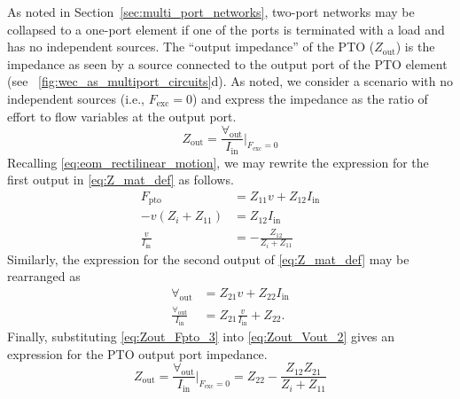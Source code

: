 \documentclass[lettersize,journal]{IEEEtran}
\begin{document}
As noted in Section~\ref{sec:multi_port_networks}, two-port networks may be collapsed to a one-port element if one of the ports is terminated with a load and has no independent sources.
The ``output impedance'' of the PTO ($Z_{\textrm{out}}$) is the impedance as seen by a source connected to the output port of the PTO element (see \figurename~\ref{fig:wec_as_multiport_circuits}d).
As noted, we consider a scenario with no independent sources (i.e., $F_{\textrm{exc}} = 0$) and express the impedance as the ratio of effort to flow variables at the output port. 
%
\begin{equation}
        Z_{\textrm{out}} = \frac{\forall_{\textrm{out}}}{I_{\textrm{in}}} \bigg\vert_{F_{\textrm{exc}}=0}
        \label{eq:Zout_1}
\end{equation}
%
Recalling \eqref{eq:eom_rectilinear_motion}, we may rewrite the expression for the first output in \eqref{eq:Z_mat_def} as follows.
%
\begin{subequations}
        \begin{align}
                F_{\textrm{pto}} &= Z_{11} v + Z_{12} I_{\textrm{in}} \label{eq:Zout_Fpto_1} \\[0.5em]
                -v (Z_i + Z_{11}) &= Z_{12} I_{\textrm{in}} \label{eq:Zout_Fpto_2} \\[0.5em]
                \frac{v}{I_{\textrm{in}}} &= -\frac{Z_{12}}{Z_i + Z_{11}} \label{eq:Zout_Fpto_3}
        \end{align}
        \label{eq:Zout_Fpto}%
\end{subequations}
%
Similarly, the expression for the second output of \eqref{eq:Z_mat_def} may be rearranged as
%
\begin{subequations}
        \begin{align}
                \forall_{\textrm{out}} &= Z_{21} v + Z_{22} I_{\textrm{in}} \label{eq:Zout_Vout_1} \\[0.5em]
                \frac{\forall_{\textrm{out}}}{I_{\textrm{in}}} &= Z_{21} \frac{v}{I_{\textrm{in}}} + Z_{22} . \label{eq:Zout_Vout_2}
        \end{align} 
        \label{eq:Zout_Vout}%
\end{subequations}
%
Finally, substituting \eqref{eq:Zout_Fpto_3} into \eqref{eq:Zout_Vout_2} gives an expression for the PTO output port impedance.
%
\begin{equation}
        Z_{\textrm{out}} = \frac{\forall_{\textrm{out}}}{I_{\textrm{in}}} \bigg\vert_{F_{\textrm{exc}}=0} = Z_{22} - \frac{Z_{12} Z_{21}}{Z_{i} + Z_{11}}
        \label{eq:pto_output_port_impedance}
\end{equation}
\end{document}
